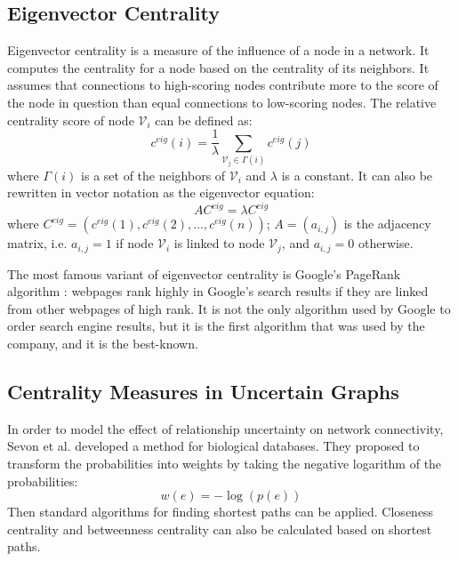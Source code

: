 \documentclass[\main/thesis.tex]{subfiles}
\begin{document}
\subsection{Eigenvector Centrality}
Eigenvector centrality \cite{bonacich1987power} is a measure of the influence of a node in a network. It computes the centrality for a node based on the centrality of its neighbors. It assumes that connections to high-scoring nodes contribute more to the score of the node in question than equal connections to low-scoring nodes. The relative centrality score of node $\mathcal{V}_i$ can be defined as:
\begin{equation}
c^{eig}(i) = \frac{1}{\lambda}\sum_{\mathcal{V}_j\in \Gamma(i)}c^{eig}(j)
\end{equation}
where $\Gamma(i)$ is a set of the neighbors of $\mathcal{V}_i$ and $\lambda$ is a constant. It can also be rewritten in vector notation as the eigenvector equation:
\begin{equation}
AC^{eig}=\lambda C^{eig}
\end{equation}
where $C^{eig} = (c^{eig}(1),c^{eig}(2),...,c^{eig}(n))$; $A=(a_{i,j})$ is the adjacency matrix, i.e. $a_{i,j}=1$ if node $\mathcal{V}_i$ is linked to node $\mathcal{V}_j$, and $a_{i,j}=0$ otherwise.

The most famous variant of eigenvector centrality is Google's PageRank algorithm \cite{page1999pagerank}: webpages rank highly in Google’s search results if they are linked from other webpages of high rank. It is not the only algorithm used by Google to order search engine results, but it is the first algorithm that was used by the company, and it is the best-known.

\subsection{Centrality Measures in Uncertain Graphs} \label{CMIUG} 
In order to model the effect of relationship uncertainty on network connectivity, Sevon et al. \cite{sevon2006link} developed a method for biological databases. They proposed to transform the probabilities into weights by taking the negative logarithm of the probabilities:
\begin{equation}
w(e) = -\log(p(e))
\end{equation}
Then standard algorithms for finding shortest paths can be applied. Closeness centrality and betweenness centrality can also be calculated based on shortest paths.
\end{document}
